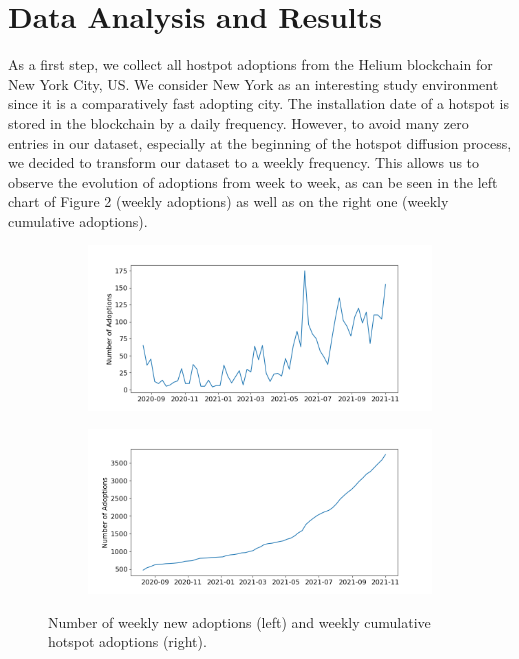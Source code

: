 \documentclass{article}
\begin{document}
\clearpage


\section{Data Analysis and Results}

As a first step, we collect all hostpot adoptions from the Helium blockchain for New York City, US. We consider New York as an interesting study
environment since it is a comparatively fast adopting city. The installation date of a hotspot is stored in the blockchain by a daily frequency. However, to
avoid many zero entries in our dataset, especially at the beginning of the hotspot diffusion process, we decided to transform our dataset to a weekly frequency.
This allows us to observe the evolution of adoptions from week to week, as can be seen in the left chart of Figure 2 (weekly adoptions) as well as on the right
one (weekly cumulative adoptions).

\begin{figure}[!hptb]
    \begin{subfigure}[h]{0.52\linewidth}
    \includegraphics[width=\linewidth]{plots/weekly_hotspot_adoptions.png}
    \end{subfigure}
    \hfill
    \begin{subfigure}[h]{0.52\linewidth}
    \includegraphics[width=\linewidth]{plots/weekly_hotspot_adoptions_cumulative.png}
    \end{subfigure}%
    \caption{Number of weekly new adoptions (left) and weekly cumulative hotspot adoptions (right).}
    \end{figure}
\end{document}
